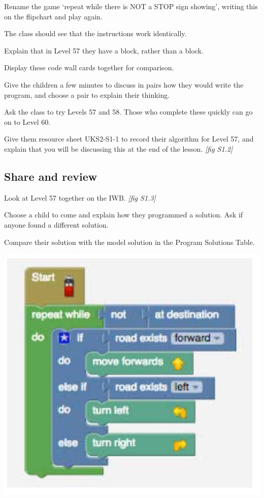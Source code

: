 \documentclass{../../../lessonplan}
\begin{document}
\begin{lessonplan}
Rename the game `repeat while there is NOT a STOP sign showing', writing this on the flipchart and play again.

The class should see that the instructions work identically.

Explain that in Level 57 they have a  block, rather than a  block.

Display these code wall cards together for comparison.

Give the children a few minutes to discuss in pairs how they would write the program, and choose a pair to explain their thinking.

Ask the class to try Levels 57 and 58.
Those who complete these quickly can go on to Level 60.

Give them resource sheet UKS2-S1-1 to record their algorithm for Level 57, and explain that you will be discussing this at the end of the lesson. \textit{[fig S1.2]}

\subsection*{Share and review}

Look at Level 57 together on the IWB. \textit{[fig S1.3]}


Choose a child to come and explain how they programmed a solution.
Ask if anyone found a different solution.

Compare their solution with the model solution in the Program Solutions Table.

\includegraphics[width=\linewidth]{solution.jpg}


\end{lessonplan}
\end{document}
